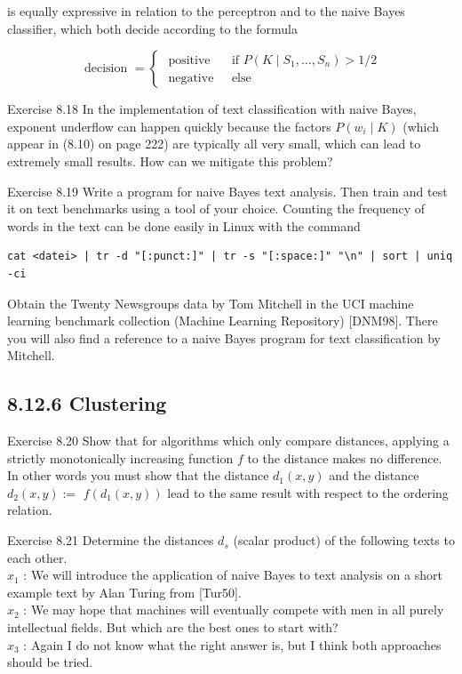 \documentclass[10pt]{article}
\begin{document}
is equally expressive in relation to the perceptron and to the naive Bayes classifier, which both decide according to the formula

$$
\text { decision }= \begin{cases}\text { positive } & \text { if } P\left(K \mid S_{1}, \ldots, S_{n}\right)>1 / 2 \\ \text { negative } & \text { else }\end{cases}
$$

Exercise 8.18 In the implementation of text classification with naive Bayes, exponent underflow can happen quickly because the factors $P\left(w_{i} \mid K\right)$ (which appear in (8.10) on page 222) are typically all very small, which can lead to extremely small results. How can we mitigate this problem?

Exercise 8.19 Write a program for naive Bayes text analysis. Then train and test it on text benchmarks using a tool of your choice. Counting the frequency of words in the text can be done easily in Linux with the command

\begin{verbatim}
cat <datei> | tr -d "[:punct:]" | tr -s "[:space:]" "\n" | sort | uniq -ci
\end{verbatim}

Obtain the Twenty Newsgroups data by Tom Mitchell in the UCI machine learning benchmark collection (Machine Learning Repository) [DNM98]. There you will also find a reference to a naive Bayes program for text classification by Mitchell.

\subsection*{8.12.6 Clustering}
Exercise 8.20 Show that for algorithms which only compare distances, applying a strictly monotonically increasing function $f$ to the distance makes no difference. In other words you must show that the distance $d_{1}(x, y)$ and the distance $d_{2}(x, y):=$ $f\left(d_{1}(x, y)\right)$ lead to the same result with respect to the ordering relation.

Exercise 8.21 Determine the distances $d_{s}$ (scalar product) of the following texts to each other.\\

$x_{1}$ : We will introduce the application of naive Bayes to text analysis on a short example text by Alan Turing from [Tur50].\\
$x_{2}$ : We may hope that machines will eventually compete with men in all purely intellectual fields. But which are the best ones to start with?\\
$x_{3}$ : Again I do not know what the right answer is, but I think both approaches should be tried.
\end{document}
